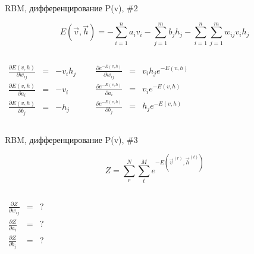 \documentclass[10pt]{beamer}
\begin{document}
\begin{frame}{RBM, дифференцирование P(v), \#2}

\begin{equation*}
E(\vec v, \vec h) = -\sum_{i=1}^n a_i v_i - \sum_{j=1}^m b_j h_j - \sum_{i=1}^n \sum_{j=1}^m w_{ij} v_i h_j
\end{equation*}

\begin{columns}
	
	\begin{eqnarray*}
	\frac{\partial E(v, h)}{\partial w_{ij}} &=& -v_i h_j \\
	\frac{\partial E(v, h)}{\partial a_{i}} &=& -v_i \\
	\frac{\partial E(v, h)}{\partial b_{j}} &=& -h_j
	\end{eqnarray*}	  
    
	
	\begin{eqnarray*}
	\frac{\partial e^{-E(v, h)}}{\partial w_{ij}} &=& v_i h_j e^{-E(v, h)} \\
	\frac{\partial e^{-E(v, h)}}{\partial a_{i}} &=& v_i e^{-E(v, h)} \\
	\frac{\partial e^{-E(v, h)}}{\partial b_{j}} &=& h_j e^{-E(v, h)}
	\end{eqnarray*}
	
\end{columns}

\end{frame}


\begin{frame}{RBM, дифференцирование P(v), \#3}

\begin{equation*}
Z = \sum_r^N \sum_t^M e^{-E(\vec v^{(r)}, \vec h^{(t)})}
\end{equation*}

\begin{columns}

	\begin{eqnarray*}
	\frac{\partial Z}{\partial w_{ij}} &=& ? \\
	\frac{\partial Z}{\partial a_{i}} &=& ? \\
	\frac{\partial Z}{\partial b_{j}} &=& ?
	\end{eqnarray*}
	
\end{columns}

\end{frame}
\end{document}
